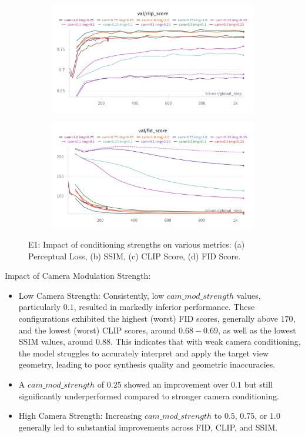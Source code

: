 \begin{figure}[htbp]
  \begin{subfigure}[b]{0.48\textwidth}
    \centering
    \includegraphics[width=\textwidth]{images/experiments/cam_img/clip_score.png}
    \label{fig:exp_cond_clip}
  \end{subfigure}
  \hfill
  \begin{subfigure}[b]{0.48\textwidth}
    \centering
    \includegraphics[width=\textwidth]{images/experiments/cam_img/fid.png}
    \label{fig:exp_cond_train_loss}
  \end{subfigure}

  \caption{E1: Impact of conditioning strengths on various metrics: (a) Perceptual Loss, (b) SSIM, (c) CLIP Score, (d) FID Score.}
  \label{fig:exp_cond_metrics_grid}
\end{figure}

Impact of Camera Modulation Strength:
\begin{itemize}
  \item Low Camera Strength: Consistently, low $cam\_mod\_strength$ values, particularly $0.1$, resulted in markedly inferior performance. These configurations exhibited the highest (worst) FID scores, generally above $170$, and the lowest (worst) CLIP scores, around $0.68-0.69$, as well as the lowest SSIM values, around $0.88$. This indicates that with weak camera conditioning, the model struggles to accurately interpret and apply the target view geometry, leading to poor synthesis quality and geometric inaccuracies.
  \item A $cam\_mod\_strength$ of $0.25$ showed an improvement over $0.1$ but still significantly underperformed compared to stronger camera conditioning.
  \item High Camera Strength: Increasing $cam\_mod\_strength$ to $0.5$, $0.75$, or $1.0$ generally led to substantial improvements across FID, CLIP, and SSIM.
\end{itemize}

